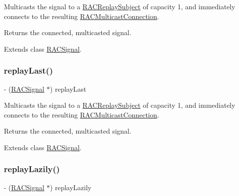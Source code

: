 Multicasts the signal to a \mbox{\hyperlink{interface_r_a_c_replay_subject}{R\+A\+C\+Replay\+Subject}} of capacity 1, and immediately connects to the resulting \mbox{\hyperlink{interface_r_a_c_multicast_connection}{R\+A\+C\+Multicast\+Connection}}.

Returns the connected, multicasted signal. 

Extends class \mbox{\hyperlink{interface_r_a_c_signal_a1a660e0db48169a1ea54288b196515b1}{R\+A\+C\+Signal}}.

\mbox{\label{category_r_a_c_signal_07_operations_08_a1a660e0db48169a1ea54288b196515b1}} 
\subsubsection{\texorpdfstring{replay\+Last()}{replayLast()}\hspace{0.1cm}{\footnotesize\ttfamily [3/3]}}
{\footnotesize\ttfamily -\/ (\mbox{\hyperlink{interface_r_a_c_signal}{R\+A\+C\+Signal}} $\ast$) replay\+Last \begin{DoxyParamCaption}{ }\end{DoxyParamCaption}}

Multicasts the signal to a \mbox{\hyperlink{interface_r_a_c_replay_subject}{R\+A\+C\+Replay\+Subject}} of capacity 1, and immediately connects to the resulting \mbox{\hyperlink{interface_r_a_c_multicast_connection}{R\+A\+C\+Multicast\+Connection}}.

Returns the connected, multicasted signal. 

Extends class \mbox{\hyperlink{interface_r_a_c_signal_a1a660e0db48169a1ea54288b196515b1}{R\+A\+C\+Signal}}.

\mbox{\label{category_r_a_c_signal_07_operations_08_aa1a3386d321ec82ceff16d98eaf74d33}} 
\subsubsection{\texorpdfstring{replay\+Lazily()}{replayLazily()}\hspace{0.1cm}{\footnotesize\ttfamily [1/3]}}
{\footnotesize\ttfamily -\/ (\mbox{\hyperlink{interface_r_a_c_signal}{R\+A\+C\+Signal}} $\ast$) replay\+Lazily \begin{DoxyParamCaption}{ }\end{DoxyParamCaption}}

